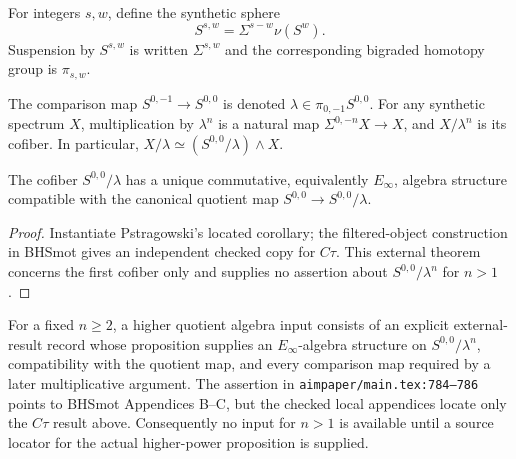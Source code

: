 \begin{definition}
  \label{def:synthetic-sphere}
  \notready
  For integers $s,w$, define the synthetic sphere
  \[
    S^{s,w}=\Sigma^{s-w}\nu(S^w).
  \]
  Suspension by $S^{s,w}$ is written $\Sigma^{s,w}$ and the corresponding
  bigraded homotopy group is $\pi_{s,w}$.
\end{definition}

\begin{definition}
  \label{def:synthetic-lambda-quotient}
  \notready
  The comparison map $S^{0,-1}\to S^{0,0}$ is denoted
  $\lambda\in\pi_{0,-1}S^{0,0}$.  For any synthetic spectrum $X$, multiplication
  by $\lambda^n$ is a natural map
  $\Sigma^{0,-n}X\to X$, and $X/\lambda^n$ is its cofiber.  In particular,
  $X/\lambda\simeq(S^{0,0}/\lambda)\mathbin{\wedge}X$.
\end{definition}

\begin{theorem}
  \label{thm:external-lambda-quotient-ring}
  \notready
  The cofiber $S^{0,0}/\lambda$ has a unique commutative, equivalently
  $E_\infty$, algebra structure compatible with the canonical quotient map
  $S^{0,0}\to S^{0,0}/\lambda$.
\end{theorem}

\begin{proof}
  Instantiate Pstragowski's located corollary; the filtered-object construction
  in BHSmot gives an independent checked copy for $C\tau$.  This external
  theorem concerns the first cofiber only and supplies no assertion about
  $S^{0,0}/\lambda^n$ for $n>1$.
\end{proof}

\begin{definition}
  \label{def:higher-lambda-quotient-algebra-input}
  \notready
  For a fixed $n\ge2$, a higher quotient algebra input consists of an explicit
  external-result record whose proposition supplies an $E_\infty$-algebra
  structure on $S^{0,0}/\lambda^n$, compatibility with the quotient map, and
  every comparison map required by a later multiplicative argument.  The
  assertion in \texttt{aimpaper/main.tex:784--786} points to BHSmot Appendices
  B--C, but the checked local appendices locate only the $C\tau$ result above.
  Consequently no input for $n>1$ is available until a source locator for the
  actual higher-power proposition is supplied.
\end{definition}

